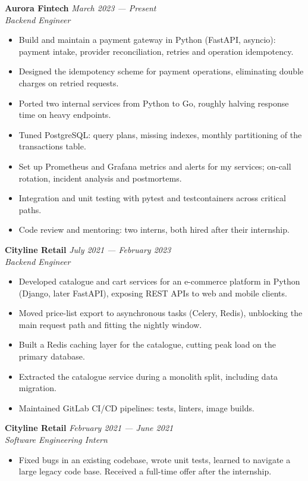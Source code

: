 \documentclass[a4paper,10pt]{article}
\newcommand{\CICD}{\mbox{CI/CD}}
\begin{document}
\textbf{Aurora Fintech} \hfill \textit{March 2023 --- Present}\\
\textit{Backend Engineer}
\begin{itemize}
    \item Build and maintain a payment gateway in Python (FastAPI, asyncio): payment
          intake, provider reconciliation, retries and operation idempotency.
    \item Designed the idempotency scheme for payment operations, eliminating double
          charges on retried requests.
    \item Ported two internal services from Python to Go, roughly halving response
          time on heavy endpoints.
    \item Tuned PostgreSQL: query plans, missing indexes, monthly partitioning of the
          transactions table.
    \item Set up Prometheus and Grafana metrics and alerts for my services; on-call
          rotation, incident analysis and postmortems.
    \item Integration and unit testing with pytest and testcontainers across critical paths.
    \item Code review and mentoring: two interns, both hired after their internship.
\end{itemize}

\textbf{Cityline Retail} \hfill \textit{July 2021 --- February 2023}\\
\textit{Backend Engineer}
\begin{itemize}
    \item Developed catalogue and cart services for an e-commerce platform in Python
          (Django, later FastAPI), exposing REST APIs to web and mobile clients.
    \item Moved price-list export to asynchronous tasks (Celery, Redis), unblocking
          the main request path and fitting the nightly window.
    \item Built a Redis caching layer for the catalogue, cutting peak load on the
          primary database.
    \item Extracted the catalogue service during a monolith split, including data migration.
    \item Maintained GitLab \CICD{} pipelines: tests, linters, image builds.
\end{itemize}

\textbf{Cityline Retail} \hfill \textit{February 2021 --- June 2021}\\
\textit{Software Engineering Intern}
\begin{itemize}
    \item Fixed bugs in an existing codebase, wrote unit tests, learned to navigate
          a large legacy code base. Received a full-time offer after the internship.
\end{itemize}
\end{document}
